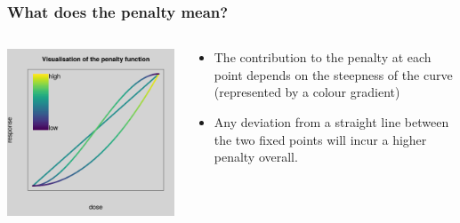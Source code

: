 \documentclass{beamer}
\begin{document}
\begin{frame}
  \frametitle{What does the penalty mean?}

  \begin{columns}
    \begin{column}{5cm}
      \includegraphics[scale=0.4]{figures/penalty1.png}
    \end{column}
    \begin{column}{4cm}
      \begin{itemize}
      \item The contribution to the penalty at each point depends on the
        steepness of the curve (represented by a colour gradient)
      \item  Any deviation from a straight line between the two fixed
        points will incur a higher penalty overall.
      \end{itemize}
    \end{column}
  \end{columns}
  
\end{frame}
\end{document}
